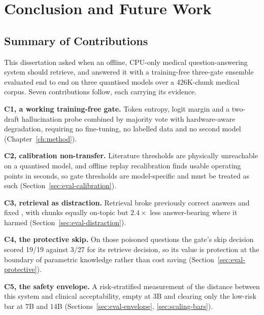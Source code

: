 \chapter{Conclusion and Future Work}
\label{ch:conclusion}

\section{Summary of Contributions}
\label{sec:conc-summary}

This dissertation asked when an offline, CPU-only medical question-answering
system should retrieve, and answered it with a training-free three-gate
ensemble evaluated end to end on three quantised models over a 426K-chunk
medical corpus. Seven contributions follow, each carrying its evidence.

\textbf{C1, a working training-free gate.} Token entropy, logit margin and a
two-draft hallucination probe combined by majority vote with hardware-aware
degradation, requiring no fine-tuning, no labelled data and no second model
(Chapter~\ref{ch:method}).

\textbf{C2, calibration non-transfer.} Literature thresholds are physically
unreachable on a quantised model, and offline replay recalibration finds
usable operating points in seconds, so gate thresholds are model-specific and
must be treated as such (Section~\ref{sec:eval-calibration}).

\textbf{C3, retrieval as distraction.} Retrieval broke \breakLlama{}
previously correct answers and fixed \fixLlama{}, with chunks equally on-topic
but $2.4\times$ less answer-bearing where it harmed
(Section~\ref{sec:eval-distraction}).

\textbf{C4, the protective skip.} On those poisoned questions the gate's skip
decision scored 19/19 against 3/27 for its retrieve decision, so its value is
protection at the boundary of parametric knowledge rather than cost saving
(Section~\ref{sec:eval-protective}).

\textbf{C5, the safety envelope.} A risk-stratified measurement of the
distance between this system and clinical acceptability, empty at 3B and
clearing only the low-risk bar at 7B and 14B
(Sections~\ref{sec:eval-envelope}, \ref{sec:scaling-bars}).


